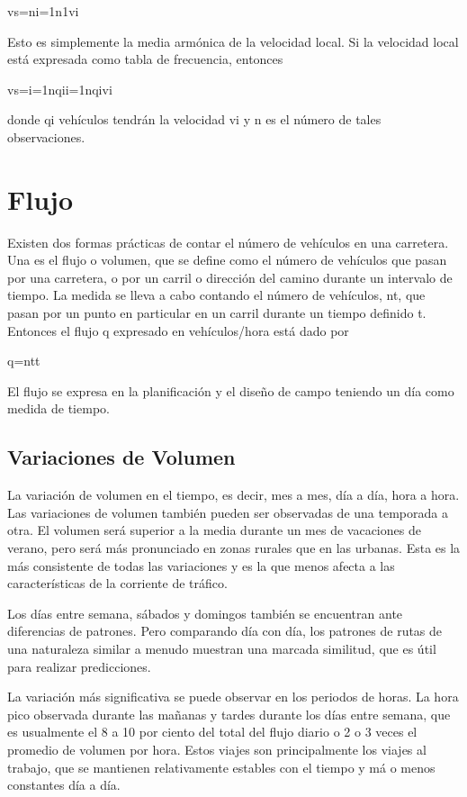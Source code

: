 vs=ni=1n1vi

Esto es simplemente la media armónica de la velocidad local. Si la velocidad local está expresada como tabla de frecuencia, entonces

vs=i=1nqii=1nqivi

donde qi vehículos tendrán la velocidad vi y n es el número de tales observaciones.

\section{Flujo}

Existen dos formas prácticas de contar el número de vehículos en una carretera. Una es el flujo o volumen, que se define como el número de vehículos que pasan por una carretera, o por un carril o dirección del camino durante un intervalo de tiempo. La medida se lleva a cabo contando el número de vehículos, nt, que pasan por un punto en particular en un carril durante un tiempo definido t. Entonces el flujo q expresado en vehículos/hora está dado por

q=ntt

El flujo se expresa en la planificación y el diseño de campo teniendo un día como medida de tiempo.

\subsection{Variaciones de Volumen}

La variación de volumen en el tiempo, es decir, mes a mes, día a día, hora a hora. Las variaciones de volumen también pueden ser observadas de una temporada a otra. El volumen será superior a la media durante un mes de vacaciones de verano, pero será más pronunciado en zonas rurales que en las urbanas. Esta es la más consistente de todas las variaciones y es la que menos afecta a las características de la corriente de tráfico.

Los días entre semana, sábados y domingos también se encuentran ante diferencias de patrones. Pero comparando día con día, los patrones de rutas de una naturaleza similar a menudo muestran una marcada similitud, que es útil para realizar predicciones.

La variación más significativa se puede observar en los periodos de horas. La hora pico observada durante las mañanas y tardes durante los días entre semana, que es usualmente el 8 a 10 por ciento del total del flujo diario o 2 o 3 veces el promedio de volumen por hora. Estos viajes son principalmente los viajes al trabajo, que se mantienen relativamente estables con el tiempo y má o menos constantes día a día.

